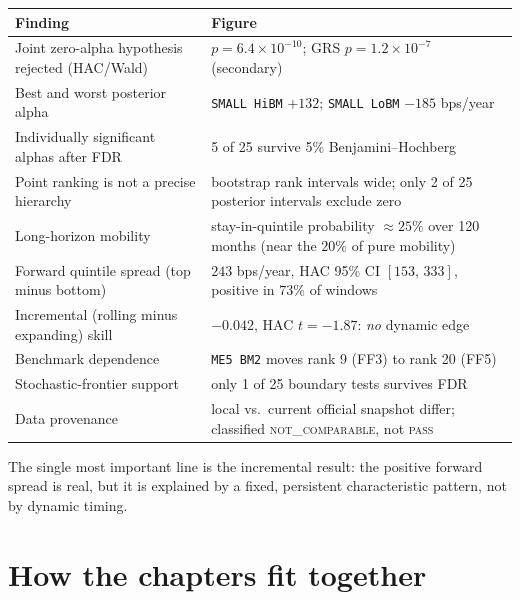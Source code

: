 \begin{longtable}[]{@{}p{}p{}@{}}
\toprule\noalign{}
Finding & Figure \\
\midrule\noalign{}
\endhead
\bottomrule\noalign{}
\endlastfoot
Joint zero-alpha hypothesis rejected (HAC/Wald) & $p = 6.4\times10^{-10}$;
GRS $p = 1.2\times10^{-7}$ (secondary) \\
Best and worst posterior alpha & \texttt{SMALL\ HiBM} $+132$; \texttt{SMALL\ LoBM}
$-185$ bps/year \\
Individually significant alphas after FDR & 5 of 25 survive 5\% Benjamini--Hochberg \\
Point ranking is not a precise hierarchy & bootstrap rank intervals wide;
only 2 of 25 posterior intervals exclude zero \\
Long-horizon mobility & stay-in-quintile probability $\approx 25\%$ over
120 months (near the $20\%$ of pure mobility) \\
Forward quintile spread (top minus bottom) & $243$ bps/year, HAC 95\% CI
$[153,\,333]$, positive in $73\%$ of windows \\
Incremental (rolling minus expanding) skill & $-0.042$, HAC $t=-1.87$:
\emph{no} dynamic edge \\
Benchmark dependence & \texttt{ME5\ BM2} moves rank 9 (FF3) to rank 20 (FF5) \\
Stochastic-frontier support & only 1 of 25 boundary tests survives FDR \\
Data provenance & local vs.\ current official snapshot differ; classified
\textsc{not\_comparable}, not \textsc{pass} \\
\end{longtable}

The single most important line is the incremental result: the positive
forward spread is real, but it is explained by a fixed, persistent
characteristic pattern, not by dynamic timing.

\hypertarget{how-the-chapters-fit-together}{%
\section{How the chapters fit
together}\label{how-the-chapters-fit-together}}

